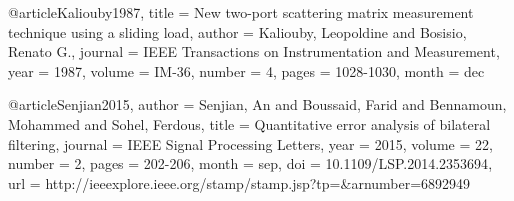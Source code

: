 





@article{Kaliouby1987,
title = {New two-port scattering matrix measurement technique using a sliding load},
author = {Kaliouby, Leopoldine and Bosisio, Renato G.},
journal = {{IEEE} Transactions on Instrumentation and Measurement},
year = {1987},
volume = {IM-36},
number = {4},
pages = {1028-1030},
month = dec
}





@article{Senjian2015,
author = {Senjian, An and Boussaid, Farid and Bennamoun, Mohammed and Sohel, Ferdous},
title = {Quantitative error analysis of bilateral filtering},
journal = {{IEEE} Signal Processing Letters},		
year = {2015},
volume = {22},
number = {2},
pages = {202-206},
month = sep,
doi = {10.1109/LSP.2014.2353694},
url = {http://ieeexplore.ieee.org/stamp/stamp.jsp?tp=&arnumber=6892949}
}






